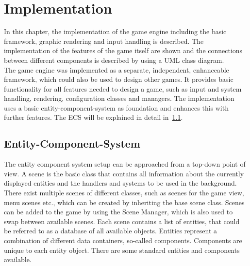 \section{Implementation}\label{sec:implementation}
In this chapter, the implementation of the game engine including the basic framework, graphic rendering and input handling is described.
The implementation of the features of the game itself are shown and the connections between different components is described by using a
UML class diagram.
\\
The game engine was implemented as a separate, independent, enhanceable framework, which could also be used to design other
games.
It provides basic functionality for all features needed to design a game, such as input and system handling, rendering, configuration
classes and managers.
The implementation uses a basic entity-component-system as foundation and enhances this with further features.
The ECS will be explained in detail in~\ref{subsec:entity-component-system}.

\subsection{Entity-Component-System}\label{subsec:entity-component-system}
The entity component system setup can be approached from a top-down point of view.
A scene is the basic class that contains all information about the currently displayed entities and the handlers and systems to be used
in the background.
There exist multiple scenes of different classes, such as scenes for the game view, menu scenes etc., which can be created by
inheriting the base scene class.
Scenes can be added to the game by using the Scene Manager, which is also used to swap between available scenes.
Each scene contains a list of entities, that could be referred to as a database of all available objects.
Entities represent a combination of different data containers, so-called components.
Components are unique to each entity object.
There are some standard entities and components available.

